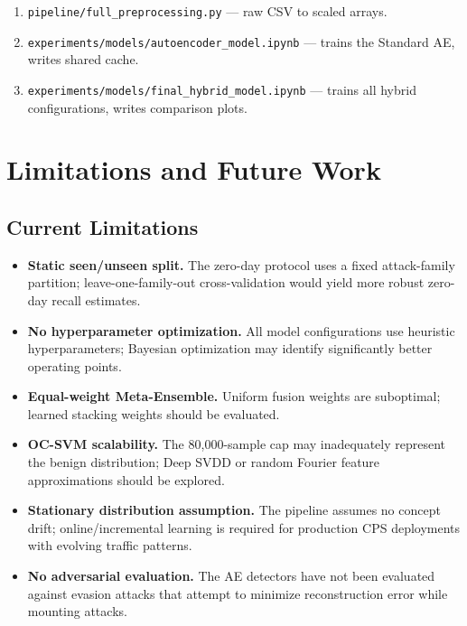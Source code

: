 \documentclass[10pt,journal,compsoc]{IEEEtran}
\begin{document}
\begin{enumerate}[leftmargin=*,noitemsep,topsep=2pt]
  \item \texttt{pipeline/full\_preprocessing.py} --- raw CSV to
        scaled arrays.
  \item \texttt{experiments/models/autoencoder\_model.ipynb} ---
        trains the Standard AE, writes shared cache.
  \item \texttt{experiments/models/final\_hybrid\_model.ipynb} ---
        trains all hybrid configurations, writes comparison plots.
\end{enumerate}

\section{Limitations and Future Work}
\label{sec:limits}

\subsection{Current Limitations}

\begin{itemize}[leftmargin=*,noitemsep]
  \item \textbf{Static seen/unseen split.}  The zero-day protocol
    uses a fixed attack-family partition; leave-one-family-out
    cross-validation would yield more robust zero-day recall estimates.
  \item \textbf{No hyperparameter optimization.}  All model
    configurations use heuristic hyperparameters; Bayesian optimization
    may identify significantly better operating points.
  \item \textbf{Equal-weight Meta-Ensemble.}  Uniform fusion weights
    are suboptimal; learned stacking weights should be evaluated.
  \item \textbf{OC-SVM scalability.}  The 80{,}000-sample cap may
    inadequately represent the benign distribution; Deep SVDD or
    random Fourier feature approximations should be explored.
  \item \textbf{Stationary distribution assumption.}  The pipeline
    assumes no concept drift; online/incremental learning is required
    for production CPS deployments with evolving traffic patterns.
  \item \textbf{No adversarial evaluation.}  The AE detectors have
    not been evaluated against evasion attacks that attempt to
    minimize reconstruction error while mounting attacks.
\end{itemize}
\end{document}

